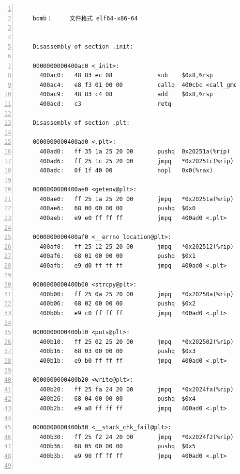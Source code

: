 \documentclass{article}
\begin{document}
\begin{lstlisting}[title = bomb的反汇编代码及部分注释, xleftmargin = 2em,xrightmargin = 2em, aboveskip = 1em, numbers = left, basicstyle=\scriptsize\ttfamily, numberstyle=\scriptsize]

    bomb：     文件格式 elf64-x86-64


    Disassembly of section .init:
    
    0000000000400ac0 <_init>:
      400ac0:	48 83 ec 08          	sub    $0x8,%rsp
      400ac4:	e8 f3 01 00 00       	callq  400cbc <call_gmon_start>
      400ac9:	48 83 c4 08          	add    $0x8,%rsp
      400acd:	c3                   	retq   
    
    Disassembly of section .plt:
    
    0000000000400ad0 <.plt>:
      400ad0:	ff 35 1a 25 20 00    	pushq  0x20251a(%rip)        # 602ff0 <_GLOBAL_OFFSET_TABLE_+0x8>
      400ad6:	ff 25 1c 25 20 00    	jmpq   *0x20251c(%rip)        # 602ff8 <_GLOBAL_OFFSET_TABLE_+0x10>
      400adc:	0f 1f 40 00          	nopl   0x0(%rax)
    
    0000000000400ae0 <getenv@plt>:
      400ae0:	ff 25 1a 25 20 00    	jmpq   *0x20251a(%rip)        # 603000 <getenv@GLIBC_2.2.5>
      400ae6:	68 00 00 00 00       	pushq  $0x0
      400aeb:	e9 e0 ff ff ff       	jmpq   400ad0 <.plt>
    
    0000000000400af0 <__errno_location@plt>:
      400af0:	ff 25 12 25 20 00    	jmpq   *0x202512(%rip)        # 603008 <__errno_location@GLIBC_2.2.5>
      400af6:	68 01 00 00 00       	pushq  $0x1
      400afb:	e9 d0 ff ff ff       	jmpq   400ad0 <.plt>
    
    0000000000400b00 <strcpy@plt>:
      400b00:	ff 25 0a 25 20 00    	jmpq   *0x20250a(%rip)        # 603010 <strcpy@GLIBC_2.2.5>
      400b06:	68 02 00 00 00       	pushq  $0x2
      400b0b:	e9 c0 ff ff ff       	jmpq   400ad0 <.plt>
    
    0000000000400b10 <puts@plt>:
      400b10:	ff 25 02 25 20 00    	jmpq   *0x202502(%rip)        # 603018 <puts@GLIBC_2.2.5>
      400b16:	68 03 00 00 00       	pushq  $0x3
      400b1b:	e9 b0 ff ff ff       	jmpq   400ad0 <.plt>
    
    0000000000400b20 <write@plt>:
      400b20:	ff 25 fa 24 20 00    	jmpq   *0x2024fa(%rip)        # 603020 <write@GLIBC_2.2.5>
      400b26:	68 04 00 00 00       	pushq  $0x4
      400b2b:	e9 a0 ff ff ff       	jmpq   400ad0 <.plt>
    
    0000000000400b30 <__stack_chk_fail@plt>:
      400b30:	ff 25 f2 24 20 00    	jmpq   *0x2024f2(%rip)        # 603028 <__stack_chk_fail@GLIBC_2.4>
      400b36:	68 05 00 00 00       	pushq  $0x5
      400b3b:	e9 90 ff ff ff       	jmpq   400ad0 <.plt>
    

\end{lstlisting}
\end{document}
